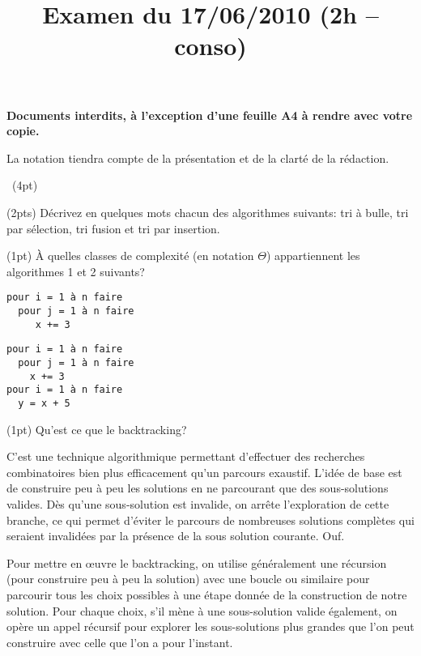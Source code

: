 \documentclass[10pt]{article}\usepackage[correction,nu]{esial}
\begin{document}
\title{Examen du 17/06/2010 (2h -- conso)}
\maketitle

\begin{centering}
  \textbf{\large Documents interdits, à l'exception d'une feuille A4 à rendre
    avec votre copie.}

\end{centering}
\centerline{La notation tiendra compte de la présentation et de la clarté de
  la rédaction.}
\bigskip



\bigskip\QuestionCours~(4pt)

\Question(2pts) Décrivez en quelques mots chacun des algorithmes suivants: tri
à bulle, tri par sélection, tri fusion et tri par insertion.

\Question(1pt) À quelles classes de complexité (en notation
$\Theta$) appartiennent les algorithmes 1 et 2 suivants?
%

\medskip\noindent\begin{minipage}{.45\linewidth}
  \begin{Verbatim}[label=algorithme 1]
pour i = 1 à n faire
  pour j = 1 à n faire
     x += 3    
  \end{Verbatim}
\end{minipage}\hfill\begin{minipage}{.45\linewidth}
  \begin{Verbatim}[label=algorithme 2]
pour i = 1 à n faire
  pour j = 1 à n faire
    x += 3
pour i = 1 à n faire
  y = x + 5
  \end{Verbatim}
\end{minipage}

\Question(1pt) Qu'est ce que le backtracking?

\begin{Reponse}
  C'est une technique algorithmique permettant d'effectuer des recherches
  combinatoires bien plus efficacement qu'un parcours exaustif. L'idée de base
  est de construire peu à peu les solutions en ne parcourant que des
  sous-solutions valides. Dès qu'une sous-solution est invalide, on arrête
  l'exploration de cette branche, ce qui permet d'éviter le parcours de
  nombreuses solutions complètes qui seraient invalidées par la présence de la
  sous solution courante. Ouf.
  
  Pour mettre en œuvre le backtracking, on utilise généralement une récursion
  (pour construire peu à peu la solution) avec une boucle ou similaire pour
  parcourir tous les choix possibles à une étape donnée de la construction de
  notre solution. Pour chaque choix, s'il mène à une sous-solution valide
  également, on opère un appel récursif pour explorer les sous-solutions plus
  grandes que l'on peut construire avec celle que l'on a pour l'instant. 
\end{Reponse}
\end{document}
